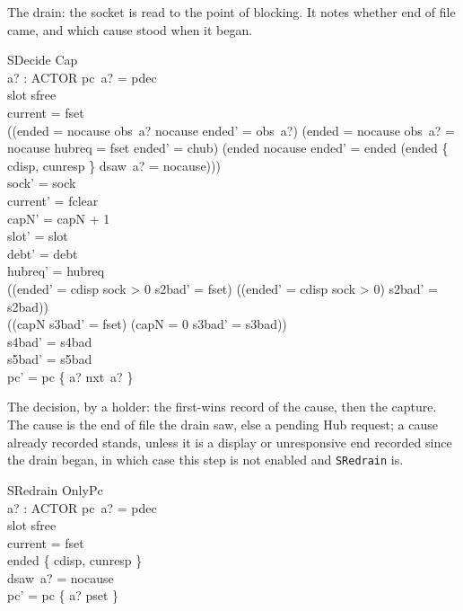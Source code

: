 \documentclass[a4paper,10pt,fleqn]{article}
\begin{document}
The drain: the socket is read to the point of blocking.  It notes whether end of
file came, and which cause stood when it began.

\begin{schema}{SDecide}
  Cap \\
  a? : ACTOR
\where
  pc~a? = pdec \\
  slot \neq sfree \\
  current = fset \\
  ((ended = nocause \land obs~a? \neq nocause \land ended' = obs~a?) \lor
    (ended = nocause \land obs~a? = nocause \land hubreq = fset \land ended' = chub) \lor
    (ended \neq nocause \land ended' = ended \land
      \lnot (ended \in \{ cdisp, cunresp \} \land dsaw~a? = nocause))) \\
  sock' = sock \\
  current' = fclear \\
  capN' = capN + 1 \\
  slot' = slot \\
  debt' = debt \\
  hubreq' = hubreq \\
  ((ended' = cdisp \land sock > 0 \land s2bad' = fset) \lor
    (\lnot (ended' = cdisp \land sock > 0) \land s2bad' = s2bad)) \\
  ((capN  \land s3bad' = fset) \lor (capN = 0 \land s3bad' = s3bad)) \\
  s4bad' = s4bad \\
  s5bad' = s5bad \\
  pc' = pc \oplus \{ a? \mapsto nxt~a? \}
\end{schema}

The decision, by a holder: the first-wins record of the cause, then the
capture.  The cause is the end of file the drain saw, else a pending Hub
request; a cause already recorded stands, unless it is a display or
unresponsive end recorded since the drain began, in which case this step is not
enabled and \texttt{SRedrain} is.

\begin{schema}{SRedrain}
  OnlyPc \\
  a? : ACTOR
\where
  pc~a? = pdec \\
  slot \neq sfree \\
  current = fset \\
  ended \in \{ cdisp, cunresp \} \\
  dsaw~a? = nocause \\
  pc' = pc \oplus \{ a? \mapsto pset \}
\end{schema}
\end{document}
